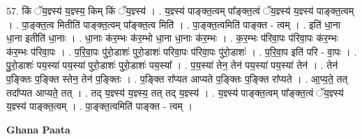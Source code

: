 \documentclass[17pt]{extarticle}
\begin{document}
57. किं ॅय॒ज्ञ्स्य॑ य॒ज्ञ्स्य॒ किम् किं ॅय॒ज्ञ्स्य॑ । . य॒ज्ञ्स्य॑ पाङ्क्त॒त्वम् पा᳚ङ्क्त॒त्वं ॅय॒ज्ञ्स्य॑ य॒ज्ञ्स्य॑ पाङ्क्त॒त्वम् । . पा॒ङ्क्त॒त्व मितीति॑ पाङ्क्त॒त्वम् पा᳚ङ्क्त॒त्व मिति॑ । . पा॒ङ्क्त॒त्वमिति॑ पाङ्क्त - त्वम् । . इति॑ धा॒ना धा॒ना इतीति॑ धा॒नाः । . धा॒नाः क॑र॒म्भः क॑र॒म्भो धा॒ना धा॒नाः क॑र॒म्भः । . क॒र॒म्भः प॑रिवा॒पः प॑रिवा॒पः क॑र॒म्भः क॑र॒म्भः प॑रिवा॒पः । . प॒रि॒वा॒पः पु॑रो॒डाशः॑ पुरो॒डाशः॑ परिवा॒पः प॑रिवा॒पः पु॑रो॒डाशः॑ । . प॒रि॒वा॒प इति॑ परि - वा॒पः । . पु॒रो॒डाशः॑ पय॒स्या॑ पय॒स्या॑ पुरो॒डाशः॑ पुरो॒डाशः॑ पय॒स्या᳚ । . प॒य॒स्या॑ तेन॒ तेन॑ पय॒स्या॑ पय॒स्या॑ तेन॑ । . तेन॑ प॒ङ्क्तिः प॒ङ्क्ति स्तेन॒ तेन॑ प॒ङ्क्तिः । . प॒ङ्क्ति रा᳚प्यत आप्यते प॒ङ्क्तिः प॒ङ्क्ति रा᳚प्यते । . आ॒प्य॒ते॒ तत् तदा᳚प्यत आप्यते॒ तत् । . तद् य॒ज्ञ्स्य॑ य॒ज्ञ्स्य॒ तत् तद् य॒ज्ञ्स्य॑ । . य॒ज्ञ्स्य॑ पाङ्क्त॒त्वम् पा᳚ङ्क्त॒त्वं ॅय॒ज्ञ्स्य॑ य॒ज्ञ्स्य॑ पाङ्क्त॒त्वम् । . पा॒ङ्क्त॒त्वमिति॑ पाङ्क्त - त्वम् । \newline

\textbf{Ghana Paata } \newline
\end{document}
